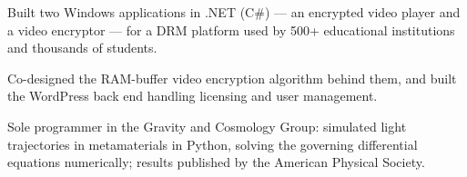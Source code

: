 \begin{CVbody}
\vspace{0.75em}

{\small
\begin{itemlist}
    \item Built two Windows applications in .NET (C\#) --- an encrypted video player and a video encryptor --- for a DRM platform used by 500+ educational institutions and thousands of students.
    \item Co-designed the RAM-buffer video encryption algorithm behind them, and built the WordPress back end handling licensing and user management.
\end{itemlist}}

\vspace{0.75em}

{\small
\begin{itemlist}
    \item Sole programmer in the Gravity and Cosmology Group: simulated light trajectories in metamaterials in Python, solving the governing differential equations numerically; results published by the American Physical Society.
\end{itemlist}}







\end{CVbody}
